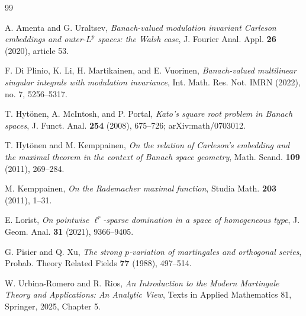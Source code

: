 \documentclass[11pt]{article}
\theoremstyle{definition}
\newcommand{\1}{\mathbf 1}
\begin{document}
\begin{thebibliography}{99}

A. Amenta and G. Uraltsev,
\emph{Banach-valued modulation invariant Carleson embeddings and outer-$L^p$
spaces: the Walsh case},
J. Fourier Anal. Appl. \textbf{26} (2020), article 53.

F. Di Plinio, K. Li, H. Martikainen, and E. Vuorinen,
\emph{Banach-valued multilinear singular integrals with modulation invariance},
Int. Math. Res. Not. IMRN (2022), no. 7, 5256--5317.

T. Hyt\"onen, A. McIntosh, and P. Portal,
\emph{Kato's square root problem in Banach spaces},
J. Funct. Anal. \textbf{254} (2008), 675--726;
arXiv:math/0703012.

T. Hyt\"onen and M. Kemppainen,
\emph{On the relation of Carleson's embedding and the maximal theorem in the
context of Banach space geometry},
Math. Scand. \textbf{109} (2011), 269--284.

M. Kemppainen,
\emph{On the Rademacher maximal function},
Studia Math. \textbf{203} (2011), 1--31.

E. Lorist,
\emph{On pointwise $\ell^r$-sparse domination in a space of homogeneous type},
J. Geom. Anal. \textbf{31} (2021), 9366--9405.

G. Pisier and Q. Xu,
\emph{The strong $p$-variation of martingales and orthogonal series},
Probab. Theory Related Fields \textbf{77} (1988), 497--514.

W. Urbina-Romero and R. Rios,
\emph{An Introduction to the Modern Martingale Theory and Applications: An
Analytic View},
Texts in Applied Mathematics 81, Springer, 2025, Chapter 5.

\end{thebibliography}
\end{document}
